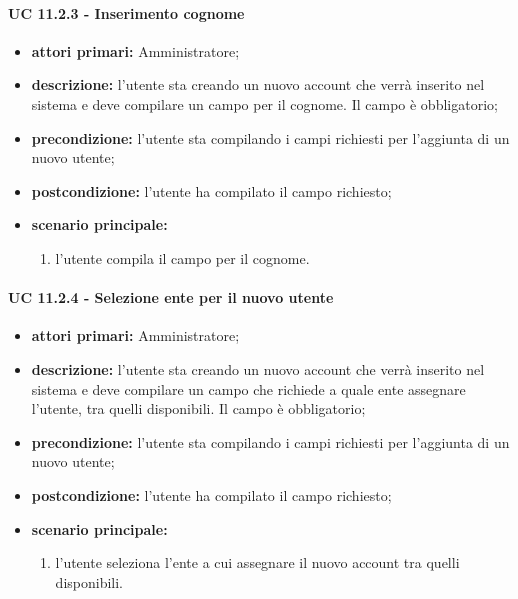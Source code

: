 			\paragraph{UC 11.2.3 - Inserimento cognome}
			\begin{itemize}
				\item \textbf{attori primari:} Amministratore;
				\item \textbf{descrizione:} l'utente sta creando un nuovo account che verrà inserito nel sistema e deve compilare un campo per il cognome. Il campo è obbligatorio;
				\item \textbf{precondizione:} l'utente sta compilando i campi richiesti per l'aggiunta di un nuovo utente;
				\item \textbf{postcondizione:} l'utente ha compilato il campo richiesto;
				\item \textbf{scenario principale:}
				\begin{enumerate}
					\item{l'utente compila il campo per il cognome.}
				\end{enumerate}	
			\end{itemize}

			\paragraph{UC 11.2.4 - Selezione ente per il nuovo utente}
			\begin{itemize}
				\item \textbf{attori primari:} Amministratore;
				\item \textbf{descrizione:} l'utente sta creando un nuovo account che verrà inserito nel sistema e deve compilare un campo che richiede a quale ente assegnare l'utente, tra quelli disponibili. Il campo è obbligatorio;
				\item \textbf{precondizione:} l'utente sta compilando i campi richiesti per l'aggiunta di un nuovo utente;
				\item \textbf{postcondizione:} l'utente ha compilato il campo richiesto;
				\item \textbf{scenario principale:}
				\begin{enumerate}
					\item{l'utente seleziona l'ente a cui assegnare il nuovo account tra quelli disponibili.}
				\end{enumerate}	
			\end{itemize}

